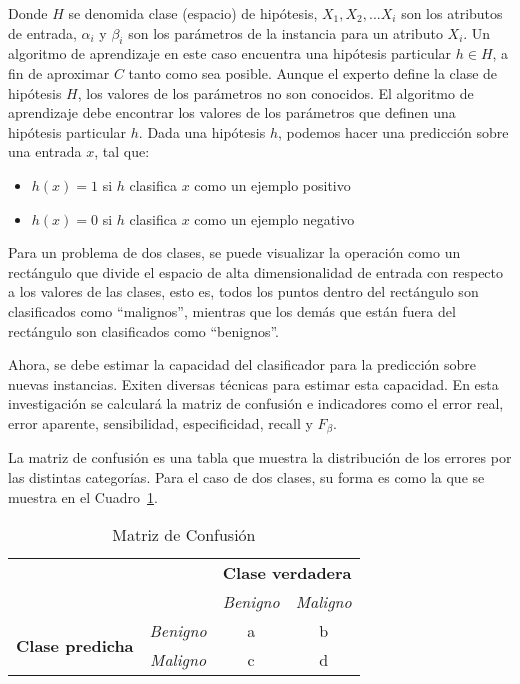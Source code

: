 \documentclass[conference]{IEEEtran}
\begin{document}
Donde $H$ se denomida clase (espacio) de hipótesis, $X_{1},X_{2},...X_{i}$ son los atributos de entrada, $\alpha_{i}$ y $\beta_{i}$ son los parámetros de la instancia para un atributo $X_{i}$. Un algoritmo de aprendizaje en este caso encuentra una hipótesis particular $h \in H$, a fin de aproximar $C$ tanto como sea posible. Aunque el experto define la clase de hipótesis $H$, los valores de los parámetros no son conocidos. El algoritmo de aprendizaje debe encontrar los valores de los parámetros que definen una hipótesis particular $h$. Dada una hipótesis $h$, podemos hacer una predicción sobre una entrada $x$, tal que:

\begin{itemize}
    \item $h(x)= 1$ si $h$ clasifica $x$ como un ejemplo positivo
    \item $h(x)= 0$ si $h$ clasifica $x$ como un ejemplo negativo \\
\end{itemize}

Para un problema de dos clases, se puede visualizar la operación como un rectángulo que divide el espacio de alta dimensionalidad de entrada con respecto a los valores de las clases, esto es, todos los puntos dentro del rectángulo son clasificados como ``malignos'', mientras que los demás que están fuera del rectángulo son clasificados como ``benignos''. \newline

Ahora, se debe estimar la capacidad del clasificador para la predicción sobre nuevas instancias. Exiten diversas técnicas para estimar esta capacidad. En esta investigación se calculará la matriz de confusión e indicadores como el error real, error aparente, sensibilidad, especificidad, recall y $F_{\beta}$. \newline

La matriz de confusión es una tabla que muestra la distribución de los errores por las distintas categorías. Para el caso de dos clases, su forma es como la que se muestra en el Cuadro~\ref{table:ConfusionMatrix}.

\begin{table}[H]
	\caption{Matriz de Confusión}
	\label{table:ConfusionMatrix}
	\begin{center}
		\begin{tabular}{cc|c|c|}
			\cline{3-4}
            &  & \multicolumn{2}{c|}{\textbf{Clase verdadera}} \\ \cline{3-4} 
            &  & \textit{Benigno}   & \textit{Maligno}   \\ \hline
			\multicolumn{1}{|c|}{\multirow{2}{*}{\textbf{Clase predicha}}} & \textit{Benigno} & a                  & b \\ \cline{2-4} 
			\multicolumn{1}{|c|}{}                                 & \textit{Maligno} & c                  & d \\ \hline
		\end{tabular}
	\end{center}
\end{table}
\end{document}

